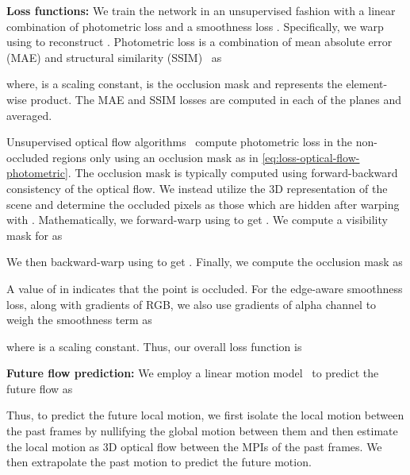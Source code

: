 \documentclass[preprint]{vgtc}
\begin{document}
    \textbf{Loss functions:}
    We train the network  in an unsupervised fashion with a linear combination of photometric loss  and a smoothness loss .
    Specifically, we warp  using  to reconstruct .
Photometric loss is a combination of mean absolute error (MAE) and structural similarity (SSIM)~\cite{wang2004image} as
    
    where,  is a scaling constant,  is the occlusion mask and  represents the element-wise product.
    The MAE and SSIM losses are computed in each of the  planes and averaged.

    Unsupervised optical flow algorithms~\cite{meister2018unflow} compute photometric loss in the non-occluded regions only using an occlusion mask  as in \autoref{eq:loss-optical-flow-photometric}.
    The occlusion mask is typically computed using forward-backward consistency of the optical flow.
    We instead utilize the 3D representation of the scene and determine the occluded pixels as those which are hidden after warping  with .
    Mathematically, we forward-warp  using  to get .
    We compute a visibility mask for  as
    
    We then backward-warp  using  to get .
    Finally, we compute the occlusion mask as
    
    A value of  in  indicates that the point is occluded.
For the edge-aware smoothness loss, along with gradients of RGB, we also use gradients of alpha channel to weigh the smoothness term as
    
where  is a scaling constant.
    Thus, our overall loss function is
    

    \textbf{Future flow prediction:}
    We employ a linear motion model~\cite{bao2019memcnet,bao2019dain} to predict the future flow as
    
    Thus, to predict the future local motion, we first isolate the local motion between the past frames by nullifying the global motion between them and then estimate the local motion as 3D optical flow between the MPIs of the past frames.
    We then extrapolate the past motion to predict the future motion.
\end{document}
